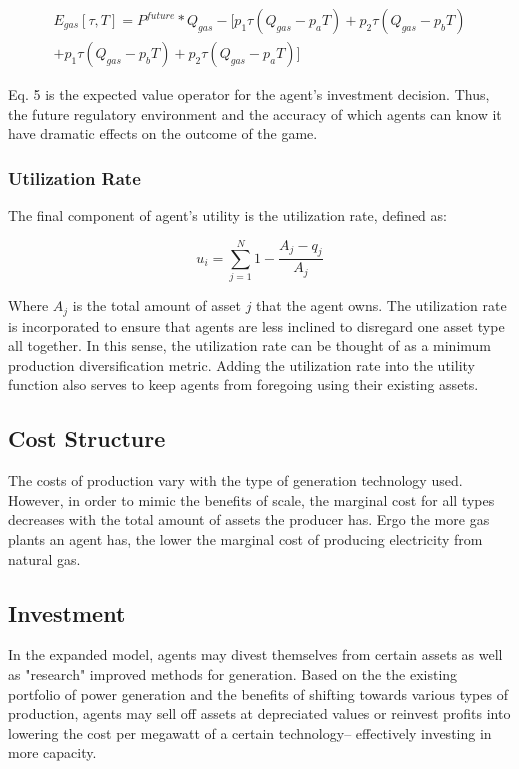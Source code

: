 \documentclass[12pt]{article}
\begin{document}
	\begin{multline}\label{EV}
		E_{gas}[\tau, T] = P^{future}*Q_{gas} - [p_1\tau (Q_{gas} - p_aT) + p_2\tau (Q_{gas} - p_bT) \\+ p_1\tau (Q_{gas} - p_bT) + p_2\tau (Q_{gas} - p_aT)]
	\end{multline}

 Eq. 5 is the expected value operator for the agent's investment decision. Thus, the future regulatory environment and the accuracy of which agents can know it have dramatic effects on the outcome of the game.   


\subsubsection{Utilization Rate}
The final component of agent's utility is the utilization rate, defined as: 

	\begin{equation}
		u_{i} = \sum_{j=1}^{N}1 - \frac{A_{j}-q_{j}}{A_{j}}
	\end{equation}

Where $A_{j}$ is the total amount of asset $j$ that the agent owns.\*
The utilization rate is incorporated to ensure that agents are less inclined to disregard one asset type all together. In this sense, the utilization rate can be thought of as a minimum production diversification metric. Adding the utilization rate into the utility function also serves to keep agents from foregoing using their existing assets. 


\subsection{Cost Structure}
The costs of production vary with the type of generation technology used. However, in order to mimic the benefits of scale, the marginal cost for all types decreases with the total amount of assets the producer has. Ergo the more gas plants an agent has, the lower the marginal cost of producing electricity from natural gas. 

\subsection{Investment}
In the expanded model, agents may divest themselves from certain assets as well as "research" improved methods for generation. Based on the the existing portfolio of power generation and the benefits of shifting towards various types of production, agents may sell off assets at depreciated values or reinvest profits into lowering the cost per megawatt of a certain technology-- effectively investing in more capacity. \* 
\end{document}
